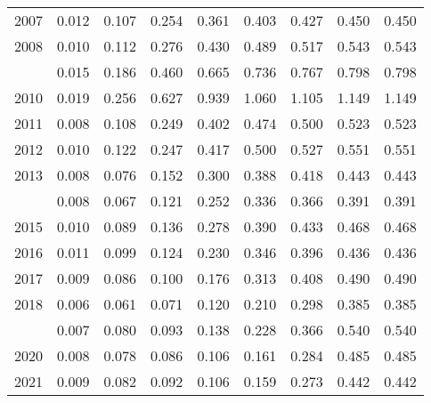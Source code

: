 \documentclass[
]{article}
\begin{document}
\begin{longtable}[t]{lrrrrrrrr}
2007 & 0.012 & 0.107 & 0.254 & 0.361 & 0.403 & 0.427 & 0.450 & 0.450\\
2008 & 0.010 & 0.112 & 0.276 & 0.430 & 0.489 & 0.517 & 0.543 & 0.543\\
\addlinespace
2009 & 0.015 & 0.186 & 0.460 & 0.665 & 0.736 & 0.767 & 0.798 & 0.798\\
2010 & 0.019 & 0.256 & 0.627 & 0.939 & 1.060 & 1.105 & 1.149 & 1.149\\
2011 & 0.008 & 0.108 & 0.249 & 0.402 & 0.474 & 0.500 & 0.523 & 0.523\\
2012 & 0.010 & 0.122 & 0.247 & 0.417 & 0.500 & 0.527 & 0.551 & 0.551\\
2013 & 0.008 & 0.076 & 0.152 & 0.300 & 0.388 & 0.418 & 0.443 & 0.443\\
\addlinespace
2014 & 0.008 & 0.067 & 0.121 & 0.252 & 0.336 & 0.366 & 0.391 & 0.391\\
2015 & 0.010 & 0.089 & 0.136 & 0.278 & 0.390 & 0.433 & 0.468 & 0.468\\
2016 & 0.011 & 0.099 & 0.124 & 0.230 & 0.346 & 0.396 & 0.436 & 0.436\\
2017 & 0.009 & 0.086 & 0.100 & 0.176 & 0.313 & 0.408 & 0.490 & 0.490\\
2018 & 0.006 & 0.061 & 0.071 & 0.120 & 0.210 & 0.298 & 0.385 & 0.385\\
\addlinespace
2019 & 0.007 & 0.080 & 0.093 & 0.138 & 0.228 & 0.366 & 0.540 & 0.540\\
2020 & 0.008 & 0.078 & 0.086 & 0.106 & 0.161 & 0.284 & 0.485 & 0.485\\
2021 & 0.009 & 0.082 & 0.092 & 0.106 & 0.159 & 0.273 & 0.442 & 0.442\\*
\end{longtable}
\end{document}

